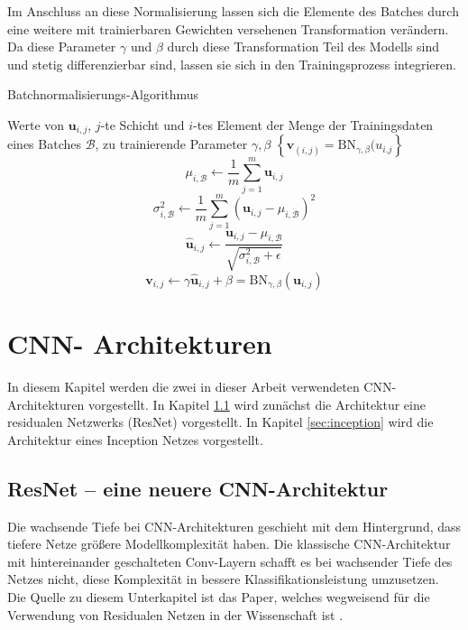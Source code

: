 Im Anschluss an diese Normalisierung lassen sich die Elemente des Batches durch eine weitere mit trainierbaren Gewichten versehenen Transformation verändern. Da diese Parameter $\gamma$ und $\beta$ durch diese Transformation Teil des Modells sind und stetig differenzierbar sind, lassen sie sich in den Trainingsprozess integrieren.

\renewcommand{\algorithmicrequire}{\textbf{Eingabe:}}
\renewcommand{\algorithmicensure}{\textbf{Ausgabe:}}


\begin{algorithm}[H]
\caption{Batchnormalisierungs-Algorithmus}
\begin{algorithmic}
\REQUIRE Werte von $\mathbf{u}_{i,j}$, $j$-te  Schicht und $i$-tes Element der Menge der Trainingsdaten  eines Batches $\mathcal{B}$, zu trainierende Parameter $\gamma, \beta$
\ENSURE $\left\{ \mathbf{v}_{(i,j)} =\text{BN}_{\gamma, \beta}(u_{i.j} \right\} $
\STATE $$\mu_{i,\mathcal{B}} \leftarrow \frac{1}{m}\sum_{j=1}^{m} \mathbf{u}_{i,j}$$
\STATE $$\sigma^2_{i,\mathcal{B}} \leftarrow \frac{1}{m} \sum_{j=1}^m \left( \mathbf{u}_{i,j} -\mu_{i,\mathcal{B}}\right)^2$$
\STATE $$ \hat{\mathbf{u}}_{i,j} \leftarrow \frac{\mathbf{u}_{i,j}-\mu_{i,\mathcal{B}}}{\sqrt{\sigma_{i,\mathcal{B}}^2+\epsilon}}$$
\STATE $$\mathbf{v}_{i,j} \leftarrow \gamma \hat{\mathbf{u}}_{i,j} + \beta  = \text{BN}_{\gamma,\beta}(\mathbf{u}_{i,j})$$
\end{algorithmic}
\label{alg:bn}
\end{algorithm}


\section{CNN- Architekturen}\label{sec:archit}
In diesem Kapitel werden die zwei in dieser Arbeit verwendeten CNN-Architekturen vorgestellt. In Kapitel \ref{sec:res} wird zunächst die Architektur eine residualen Netzwerks (ResNet) vorgestellt. In Kapitel \ref{sec:inception} wird die Architektur eines Inception Netzes vorgestellt.
\subsection{ResNet -- eine neuere CNN-Architektur}\label{sec:res}
Die wachsende Tiefe bei CNN-Architekturen geschieht mit dem Hintergrund, dass tiefere Netze größere Modellkomplexität haben. Die klassische CNN-Architektur mit hintereinander geschalteten Conv-Layern schafft es bei wachsender Tiefe des Netzes nicht, diese Komplexität in bessere Klassifikationsleistung umzusetzen. Die Quelle zu diesem Unterkapitel ist das Paper, welches wegweisend für die Verwendung von Residualen Netzen in der Wissenschaft ist \cite{resnet}.


